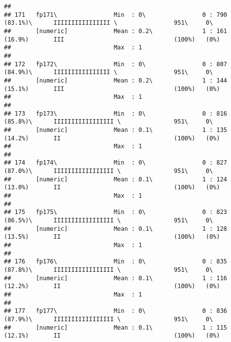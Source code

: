 \documentclass[]{article}
\begin{document}
\begin{verbatim}
## 
## 171   fp171\                Min  : 0\                0 : 790 (83.1%)\      IIIIIIIIIIIIIIII \                951\     0\       
##       [numeric]             Mean : 0.2\              1 : 161 (16.9%)       III                               (100%)   (0%)     
##                             Max  : 1                                                                                           
## 
## 172   fp172\                Min  : 0\                0 : 807 (84.9%)\      IIIIIIIIIIIIIIII \                951\     0\       
##       [numeric]             Mean : 0.2\              1 : 144 (15.1%)       III                               (100%)   (0%)     
##                             Max  : 1                                                                                           
## 
## 173   fp173\                Min  : 0\                0 : 816 (85.8%)\      IIIIIIIIIIIIIIIII \               951\     0\       
##       [numeric]             Mean : 0.1\              1 : 135 (14.2%)       II                                (100%)   (0%)     
##                             Max  : 1                                                                                           
## 
## 174   fp174\                Min  : 0\                0 : 827 (87.0%)\      IIIIIIIIIIIIIIIII \               951\     0\       
##       [numeric]             Mean : 0.1\              1 : 124 (13.0%)       II                                (100%)   (0%)     
##                             Max  : 1                                                                                           
## 
## 175   fp175\                Min  : 0\                0 : 823 (86.5%)\      IIIIIIIIIIIIIIIII \               951\     0\       
##       [numeric]             Mean : 0.1\              1 : 128 (13.5%)       II                                (100%)   (0%)     
##                             Max  : 1                                                                                           
## 
## 176   fp176\                Min  : 0\                0 : 835 (87.8%)\      IIIIIIIIIIIIIIIII \               951\     0\       
##       [numeric]             Mean : 0.1\              1 : 116 (12.2%)       II                                (100%)   (0%)     
##                             Max  : 1                                                                                           
## 
## 177   fp177\                Min  : 0\                0 : 836 (87.9%)\      IIIIIIIIIIIIIIIII \               951\     0\       
##       [numeric]             Mean : 0.1\              1 : 115 (12.1%)       II                                (100%)   (0%)     

\end{verbatim}
\end{document}
